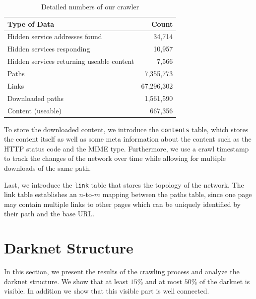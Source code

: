 \begin{table}[H]
    \begin{center}
        \caption{Detailed numbers of our crawler}
        \label{table:scrapMetrics}
        \begin{tabular}[l]{l|r}
        \textbf{Type of Data}           & \textbf{Count} \\
        \hline
        \hline
        Hidden service addresses found      & 34,714                                    \\
        \hline
        Hidden services responding                & 10,957                      \\
        \hline
        Hidden services returning useable content & 7,566                      \\
        \hline
        Paths                           & 7,355,773                   \\
        \hline
        Links                           & 67,296,302                \\
        \hline
        Downloaded paths                & 1,561,590                 \\
        \hline
        Content (useable)               & 667,356         \\
        \end{tabular}
    \end{center}
\end{table}

To store the downloaded content, we introduce the \texttt{contents} table, which stores the content itself as well as some meta information about the content such as the HTTP status code and the MIME type. Furthermore, we use a crawl timestamp to track the changes of the network over time while allowing for multiple downloads of the same path.

Last, we introduce the \texttt{link} table that stores the topology of the network. The link table establishes an $n$-to-$m$ mapping between the paths table, since one page may contain multiple links to other pages which can be uniquely identified by their path and the base URL.
%
%
\section{Darknet Structure}
\label{sec:data}
In this section, we present the results of the crawling process and analyze the darknet structure. We show that at least $15\%$ and at most $50\%$ of the darknet is visible. In addition we show that this visible part is well connected. 


